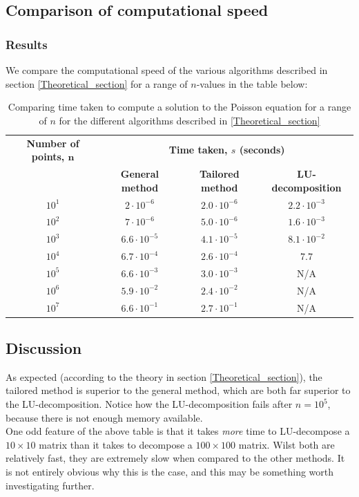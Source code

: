 \documentclass[a4paper, 10pt]{article}
\begin{document}
\subsection{Comparison of computational speed}
\subsubsection{Results}
We compare the computational speed of the various algorithms described in section \ref{Theoretical_section} for a range of $n$-values in the table below:
\begin{table}[h]
\label{table1}
\begin{tabular}{|c|c|c|c|}
\hline
 \multicolumn{1}{|c|}{\textbf{Number of points, $\mathbf{n}$}} & 
  \multicolumn{3}{|c|}{\textbf{Time taken, $s$ (seconds)}} \\
\cline{2-4}
 & \textbf{General method} & \textbf{Tailored method} & \textbf{LU-decomposition} \\
\hline
$10^1$ & $2\cdot 10^{-6}$ & $2.0\cdot 10^{-6}$ & $2.2\cdot 10^{-3}$\\
$10^2$ & $7\cdot 10^{-6}$ & $5.0\cdot 10^{-6}$ & $1.6 \cdot 10^{-3}$\\
$10^3$ & $6.6\cdot 10^{-5}$ & $4.1\cdot 10^{-5}$ & $8.1\cdot 10^{-2}$\\
$10^4$ & $6.7\cdot 10^{-4}$ & $2.6\cdot 10^{-4}$ & $7.7$\\
$10^5$ & $6.6 \cdot 10^{-3}$& $3.0 \cdot 10^{-3}$& N/A\\
$10^6$ & $5.9\cdot 10^{-2}$ & $2.4 \cdot 10^{-2}$& N/A\\
$10^7$ & $6.6 \cdot 10^{-1}$ & $2.7 \cdot 10^{-1}$& N/A\\
\hline
\end{tabular}
\caption{Comparing time taken to compute a solution to the Poisson equation for a range of $n$ for the different algorithms described in \ref{Theoretical_section}}
\end{table}
\subsection{Discussion}
As expected (according to the theory in section \ref{Theoretical_section}), the tailored method is superior to the general method, which are both far superior to the LU-decomposition. Notice how the LU-decomposition fails after $n=10^5$, because there is not enough memory available.\\
\linebreak
One odd feature of the above table is that it takes \textit{more} time to LU-decompose a $10\times 10$ matrix than it takes to decompose a $100 \times 100$ matrix. Wilst both are relatively fast, they are extremely slow when compared to the other methods. It is not entirely obvious why this is the case, and this may be something worth investigating further.
\end{document}
